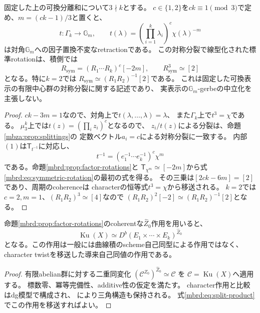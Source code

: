 \begin{corollary}[対称分裂に対応する積側のrotation]
\label{mbrd:cor:symmetric-rotation}
固定した上の可換分離和について$3\nmid k$とする。
$c\in\{1,2\}$を$ck\equiv1\pmod3$で定め、$m=(ck-1)/3$と置くと、
\[
 t:\Gamma_k\longrightarrow\mathbb G_m,\qquad
 t(\lambda)=\left(\prod_{i=1}^k\lambda_i\right)^c\chi(\lambda)^{-m}
\]
は対角$\mathbb G_m$への因子置換不変なretractionである。
この対称分裂で線型化された標準rotationは、積側では
\begin{equation}\label{mbrd:eq:symmetric-rotation}
 R_{\mathrm{sym}}=(R_1\cdots R_k)^c[-2m],
 \qquad R_{\mathrm{sym}}^3\simeq[2]
\end{equation}
となる。特に$k=2$では
$R_{\mathrm{sym}}\simeq(R_1R_2)^{-1}[2]$である。
これは固定した可換表示の有限中心群の対称分裂に関する記述であり、
実表示の$\mathbb G_m$-gerbeの中立化を主張しない。
\end{corollary}
\begin{proof}
$ck-3m=1$なので、対角上で$t(\lambda,\ldots,\lambda)=\lambda$、
また$\Gamma_k$上で$t^3=\chi$である。
$\mu_3^k$上では$t(z)=(\prod_i z_i)^c$となるので、
$z_i/t(z)$による分裂は、命題\ref{mbza:prop:splittings}の
定数ベクトル$a_i=c$による対称分裂に一致する。
内部$(1)$は$\mathsf T_{t^{-1}}$に対応し、
\[
 t^{-1}=(e_1^{-1}\cdots e_k^{-1})^c\chi^m
\]
である。命題\ref{mbrd:prop:factor-rotations}と
$\mathsf T_{\chi^m}\simeq[-2m]$から式\eqref{mbrd:eq:symmetric-rotation}の最初の式を得る。
その三乗は$[2ck-6m]=[2]$であり、周期のcoherenceは
characterの恒等式$t^3=\chi$から移送される。
$k=2$では$c=2,m=1$、$(R_1R_2)^3\simeq[4]$なので
$(R_1R_2)^2[-2]\simeq(R_1R_2)^{-1}[2]$となる。
\end{proof}

\begin{corollary}[双対作用による通常のKuznetsov圏]
\label{mbrd:cor:dual-action}
命題\ref{mbrd:prop:factor-rotations}のcoherentな$\widehat Z_0$作用を用いると、
\begin{equation}\label{mbrd:eq:dual-action}
 \operatorname{Ku}(X)\simeq
 D^b(E_1\times\cdots\times E_k)^{\widehat Z_0}
\end{equation}
となる。この作用は一般には曲線積のscheme自己同型による作用ではなく、
character twistを移送した導来自己同値の作用である。
\end{corollary}
\begin{proof}
有限abelian群に対する二重同変化
$(\mathcal C^{Z_0})^{\widehat Z_0}\simeq\mathcal C$
\cite[Theorem~4.2]{MEDElagin}を
$\mathcal C=\operatorname{Ku}(X)$へ適用する。
標数零、冪等完備性、additive性の仮定を満たす。
character作用と比較はdg模型で構成され、
\cite[Lemma~8.6, Theorems~8.7, 8.9]{MEDElagin}により三角構造も保持される。
式\eqref{mbrd:eq:split-product}でこの作用を移送すればよい。
\end{proof}


